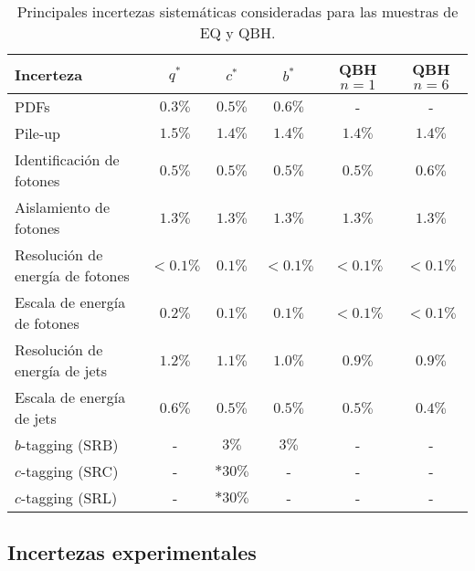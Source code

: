 \begin{table}
    \caption{Principales incertezas sistemáticas consideradas para las muestras de \ac{EQ} y \ac{QBH}.}
    
    \centering
    \begin{tabular}{lccccc}
        \toprule
        Incerteza                       & \(q^*\)       & \(c^*\)   & \(b^*\)       & QBH \(n=1\)   & QBH \(n=6\) \\
        \midrule
        PDFs                            & \(0.3\%\)     & \(0.5\%\) & \(0.6\%\)     & -             & -           \\
        \midrule
        Pile-up                         & \(1.5\%\)     & \(1.4\%\) & \(1.4\%\)     & \(1.4\%\)     & \(1.4\%\)  \\
        \midrule
        Identificación de fotones       & \(0.5\%\)     & \(0.5\%\) & \(0.5\%\)     & \(0.5\%\)     & \(0.6\%\)  \\
        Aislamiento de fotones          & \(1.3\%\)     & \(1.3\%\) & \(1.3\%\)     & \(1.3\%\)     & \(1.3\%\)  \\
        Resolución de energía de fotones& \(<0.1\%\)    & \(0.1\%\) & \(<0.1\%\)    & \(<0.1\%\)    & \(<0.1\%\)  \\
        Escala de energía de fotones    & \(0.2\%\)     & \(0.1\%\) & \(0.1\%\)     & \(<0.1\%\)    & \(<0.1\%\)  \\
        \midrule
        Resolución de energía de jets   & \(1.2\%\)     & \(1.1\%\) & \(1.0\%\)     & \(0.9\%\)     & \(0.9\%\)  \\
        Escala de energía de jets       & \(0.6\%\)     & \(0.5\%\) & \(0.5\%\)     & \(0.5\%\)     & \(0.4\%\)  \\
        \midrule
        \(b\)-tagging (SRB)             & -             & \(3\%\)   & \(3\%\)       & -             & -           \\
        \(c\)-tagging (SRC)             & -             & \(*30\%\) & -             & -             & -           \\
        \(c\)-tagging (SRL)             & -             & \(*30\%\) & -             & -             & -          \\
        \bottomrule
    \end{tabular}
    \label{tab:signals:systs:main_systs}
\end{table}



\subsection{Incertezas experimentales}
\label{subsec:signals:systs:exp}

